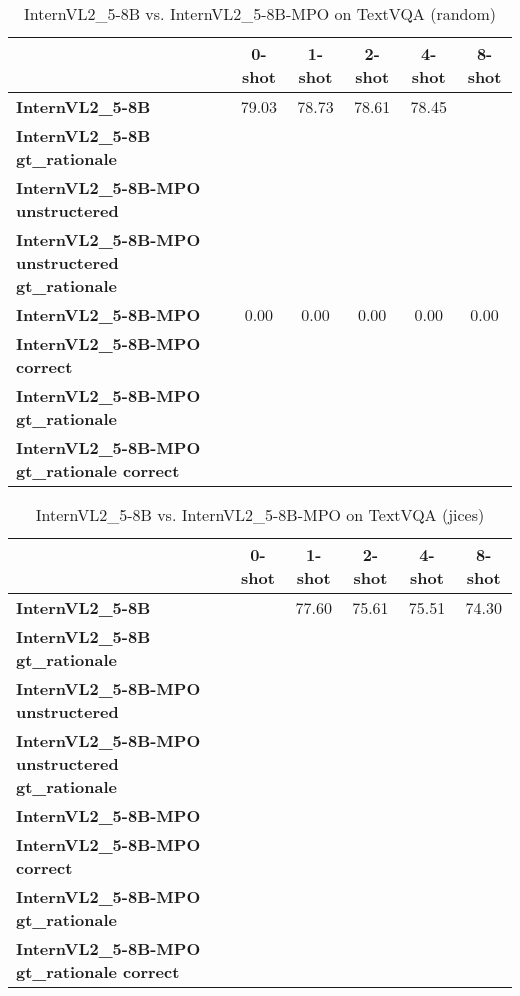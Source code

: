 \begin{table}
\caption{InternVL2\_5-8B vs. InternVL2\_5-8B-MPO on TextVQA (random)}
\label{tab:InternVL2_5-8B_TextVQA_TRAIN_random}
\begin{tabular}{lccccc}
\toprule
 & 0-shot & 1-shot & 2-shot & 4-shot & 8-shot \\
\midrule
\textbf{InternVL2\_5-8B} & 79.03 & 78.73 & 78.61 & 78.45 &  \\
\textbf{InternVL2\_5-8B gt\_rationale} &  &  &  &  &  \\
\textbf{InternVL2\_5-8B-MPO unstructered} &  &  &  &  &  \\
\textbf{InternVL2\_5-8B-MPO unstructered gt\_rationale} &  &  &  &  &  \\
\textbf{InternVL2\_5-8B-MPO} & 0.00 & 0.00 & 0.00 & 0.00 & 0.00 \\
\textbf{InternVL2\_5-8B-MPO correct} &  &  &  &  &  \\
\textbf{InternVL2\_5-8B-MPO gt\_rationale} &  &  &  &  &  \\
\textbf{InternVL2\_5-8B-MPO gt\_rationale correct} &  &  &  &  &  \\
\bottomrule
\end{tabular}
\end{table}


\begin{table}
\caption{InternVL2\_5-8B vs. InternVL2\_5-8B-MPO on TextVQA (jices)}
\label{tab:InternVL2_5-8B_TextVQA_TRAIN_jices}
\begin{tabular}{lccccc}
\toprule
 & 0-shot & 1-shot & 2-shot & 4-shot & 8-shot \\
\midrule
\textbf{InternVL2\_5-8B} &  & 77.60 & 75.61 & 75.51 & 74.30 \\
\textbf{InternVL2\_5-8B gt\_rationale} &  &  &  &  &  \\
\textbf{InternVL2\_5-8B-MPO unstructered} &  &  &  &  &  \\
\textbf{InternVL2\_5-8B-MPO unstructered gt\_rationale} &  &  &  &  &  \\
\textbf{InternVL2\_5-8B-MPO} &  &  &  &  &  \\
\textbf{InternVL2\_5-8B-MPO correct} &  &  &  &  &  \\
\textbf{InternVL2\_5-8B-MPO gt\_rationale} &  &  &  &  &  \\
\textbf{InternVL2\_5-8B-MPO gt\_rationale correct} &  &  &  &  &  \\
\bottomrule
\end{tabular}
\end{table}
